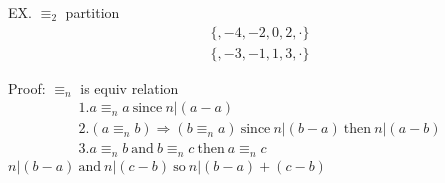 \documentclass[class=scrartcl, crop=false]{standalone}
\begin{document}
EX.  $\equiv_2$ partition 
\begin{align*}
  \{, -4, -2, 0, 2, \cdot \} \\
  \{, -3, -1, 1, 3, \cdot \}
\end{align*} 

Proof: $\equiv_n $ is equiv relation
\begin{align*}
  1. a \equiv_n a \ \text{since} \  n|(a - a)  \\
2. (a \equiv_n b) \Rightarrow (b \equiv_n a) \ \text{since} \ n | (b - a) \ \text{then} \ n|(a - b) \\
3. a \equiv_n b \ \text{and} \ b \equiv_n c \ \text{then} \ a \equiv_n c
\end{align*} 
$n | (b - a) \ \text{and} \ n | (c - b) \ \text{so} \ n | (b - a) + (c - b)$
\end{document}
